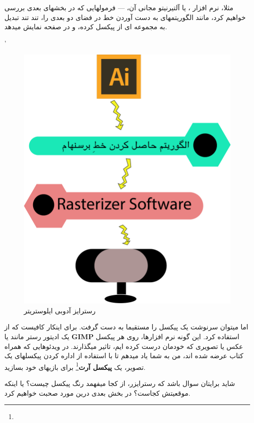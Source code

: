 \documentclass[14pt,a4paper]{memoir}
\begin{document}
	 مثلا، نرم افزار ، یا آلتیرنیتو مجانی آن، \textbf{} --- فرمولهایی که در بخشهای بعدی بررسی خواهیم کرد، مانند الگوریتمهای به دست آوردن خط در فضای دو بعدی را، تند تند تبدیل به مجموعه ای از پیکسل کرده، و در صفحه نمایش میدهد.
	 
	 '
	 
\begin{figure}[H]
	\centering
	\includegraphics[scale=1]{Rasterizer}
	\caption{رسترایز آدوبی ایلوستریتر}
\end{figure}
	 
	 
	 
	 
	 اما میتوان سرنوشت یک پیکسل را مستقیما به دست گرفت. برای اینکار کافیست که از یک ادیتور رستر مانند \textbf{} یا \textbf{GIMP} استفاده کرد. این گونه نرم افزارها، روی هر پیکسل عکس یا تصویری که خودمان درست کرده ایم، تاثیر میگذارند. در ویدئوهایی که همراه کتاب عرضه شده اند، من به شما یاد میدهم تا با استفاده از اداره کردن پیکسلهای یک تصویر، یک \textbf{پیکسل آرت}\footnote{} برای بازیهای خود بسازید.	 
	 
	 
	 شاید برایتان سوال باشد که رسترایزر، از کجا میفهمد رنگ پیکسل چیست؟ یا اینکه موقعیتش کجاست؟ در بخش بعدی درین مورد صحبت خواهیم کرد.
	 
\end{document}
